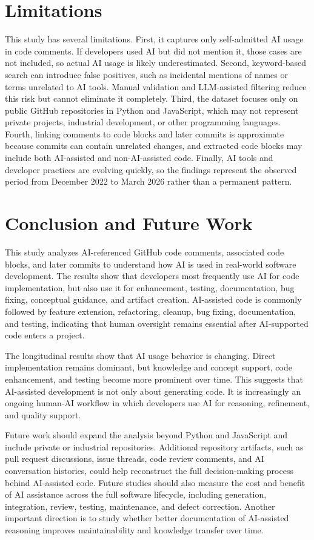 \documentclass[12pt,draftclsnofoot,onecolumn]{IEEEtran}
\begin{document}
\section{Limitations}

This study has several limitations. First, it captures only self-admitted AI usage in code comments. If developers used AI but did not mention it, those cases are not included, so actual AI usage is likely underestimated. Second, keyword-based search can introduce false positives, such as incidental mentions of names or terms unrelated to AI tools. Manual validation and LLM-assisted filtering reduce this risk but cannot eliminate it completely. Third, the dataset focuses only on public GitHub repositories in Python and JavaScript, which may not represent private projects, industrial development, or other programming languages. Fourth, linking comments to code blocks and later commits is approximate because commits can contain unrelated changes, and extracted code blocks may include both AI-assisted and non-AI-assisted code. Finally, AI tools and developer practices are evolving quickly, so the findings represent the observed period from December 2022 to March 2026 rather than a permanent pattern.

\section{Conclusion and Future Work}

This study analyzes AI-referenced GitHub code comments, associated code blocks, and later commits to understand how AI is used in real-world software development. The results show that developers most frequently use AI for code implementation, but also use it for enhancement, testing, documentation, bug fixing, conceptual guidance, and artifact creation. AI-assisted code is commonly followed by feature extension, refactoring, cleanup, bug fixing, documentation, and testing, indicating that human oversight remains essential after AI-supported code enters a project.

The longitudinal results show that AI usage behavior is changing. Direct implementation remains dominant, but knowledge and concept support, code enhancement, and testing become more prominent over time. This suggests that AI-assisted development is not only about generating code. It is increasingly an ongoing human-AI workflow in which developers use AI for reasoning, refinement, and quality support.

Future work should expand the analysis beyond Python and JavaScript and include private or industrial repositories. Additional repository artifacts, such as pull request discussions, issue threads, code review comments, and AI conversation histories, could help reconstruct the full decision-making process behind AI-assisted code. Future studies should also measure the cost and benefit of AI assistance across the full software lifecycle, including generation, integration, review, testing, maintenance, and defect correction. Another important direction is to study whether better documentation of AI-assisted reasoning improves maintainability and knowledge transfer over time.



\end{document}
